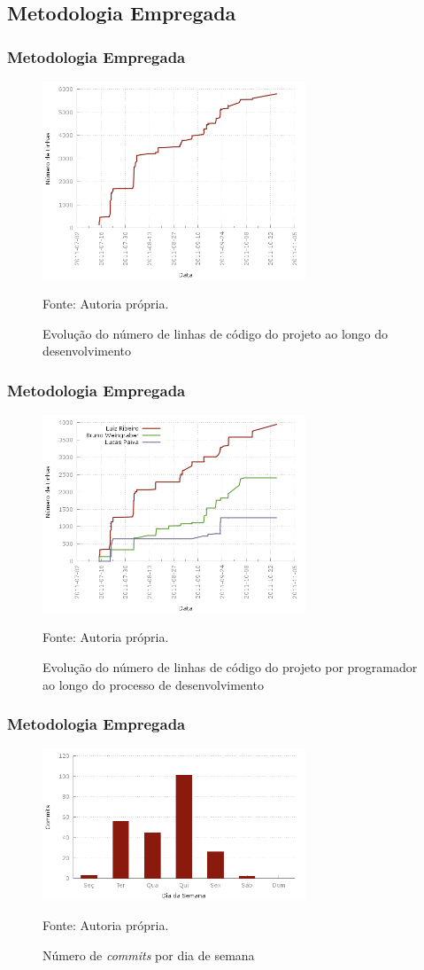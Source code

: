 \subsection{Metodologia Empregada}
\frame
{
\frametitle{Metodologia Empregada}
\begin{figure}
\includegraphics[width=0.7\textwidth]{./imgs/lines_of_code.png}
\caption{Evolução do número de linhas de código do projeto ao longo do desenvolvimento}
\tiny
Fonte: Autoria própria.
\end{figure}
}

\frame
{
\frametitle{Metodologia Empregada}
\begin{figure}
\includegraphics[width=0.7\textwidth]{./imgs/lines_of_code_by_author.png}
\caption{Evolução do número de linhas de código do projeto por programador ao longo do processo de desenvolvimento}
\tiny
Fonte: Autoria própria.
\end{figure}
}

\frame
{
\frametitle{Metodologia Empregada}
\begin{figure}
\includegraphics[width=0.7\textwidth]{./imgs/day_of_week.png}
\caption{Número de \emph{commits} por dia de semana}
\tiny
Fonte: Autoria própria.
\end{figure}


}

